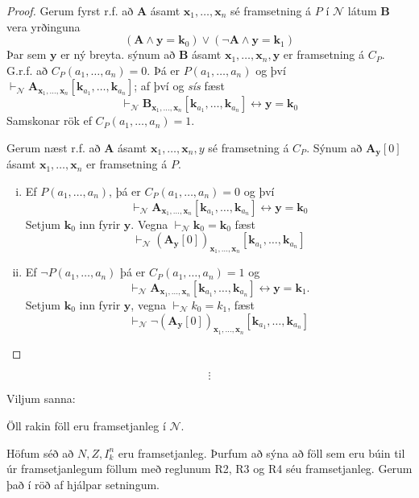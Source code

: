 \documentclass[12pt]{book}
\newcommand{\cN}{\mathcal{N}}
\newcommand{\bA}{\mathbf{A}}
\newcommand{\bB}{\mathbf{B}}
\newcommand{\bx}{\mathbf{x}}
\newcommand{\bk}{\mathbf{k}}
\newcommand{\by}{\mathbf{y}}
\newcommand{\bxxn}{\bx_1, \dotsc, \bx_n}
\newcommand{\aan}{a_1, \dotsc, a_n}
\begin{document}
\begin{proof}
  Gerum fyrst r.f. að $\bA$ ásamt $\bxxn$ sé framsetning á $P$ í $\cN$
  látum $\bB$ vera yrðinguna
  \[ ( \bA \wedge \by = \bk_0) \vee (\lnot \bA \wedge \by = \bk_1)\]
  Þar sem $\by$ er ný breyta. sýnum að $\bB$
  ásamt $\bxxn, \by$ er framsetning á $C_P$.
  G.r.f. að $C_P (\aan) = 0$. Þá er $P(\aan)$
  og því $\vdash_{\cN} \bA_{\bxxn} [\bk_{a_1}, \dotsc,\bk_{a_n}]$; af því og \emph{sís}
  fæst
  \[ \vdash_{\cN} \bB_{\bxxn} [ \bk_{a_1}, \dotsc,\bk_{a_n} ] \leftrightarrow \by = \bk_0 \]
  Samskonar rök ef $C_P (\aan) = 1$.

  Gerum næst r.f. að $\bA$ ásamt $\bxxn, y$ sé framsetning á $C_P$. Sýnum að
  $\bA_{\by}[0]$ ásamt $\bxxn$ er framsetning á $P$.
  \begin{enumerate}[(i)]
  \item Ef $P(\aan)$, þá er $C_P(\aan) = 0$ og því
    \[\vdash_{\cN} \bA_{\bxxn}[\bk_{a_1}, \dotsc,\bk_{a_n}] \leftrightarrow \by = \bk_0 \]
    Setjum $\bk_0$ inn fyrir $\by$. Vegna $\vdash_{\cN} \bk_0 = \bk_0$
    fæst \[\vdash_{\cN} ( \bA_{\by}[0] )_{\bxxn}[\bk_{a_1}, \dotsc,\bk_{a_n}]\]
  \item Ef $\lnot P(\aan)$ þá er $C_P ( \aan) = 1$
    og \[\vdash_{\cN} \bA_{\bxxn} [ \bk_{a_1}, \dotsc,\bk_{a_n}] \leftrightarrow \by = \bk_1.\]
    Setjum $\bk_0$ inn fyrir $\by$, vegna $\vdash_{\cN} k_0 = k_1$, fæst
    \[ \vdash_{\cN} \lnot (\bA_{\by}[0])_{\bxxn} [\bk_{a_1}, \dotsc,\bk_{a_n}]\]
  \end{enumerate}
\end{proof}



\[\vdots\]

Viljum sanna:

\begin{setn}[Framsetningarsetning]
Öll rakin föll eru framsetjanleg í $\cN$.
\end{setn}

Höfum séð að $N, Z, I_k^n$ eru framsetjanleg. Þurfum að sýna að 
föll sem eru búin til úr framsetjanlegum föllum með reglunum 
R2, R3 og R4 séu framsetjanleg. Gerum það í röð af hjálpar setningum.
\end{document}
